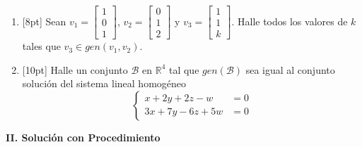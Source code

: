 \documentclass[11pt]{article}
\begin{document}
\begin{enumerate}
\item{}[8pt] Sean $v_1 = \begin{bmatrix}1\\0\\1\end{bmatrix}$, $v_2 = \begin{bmatrix}0\\1\\2\end{bmatrix}$ y $v_3 = \begin{bmatrix}1\\1\\k\end{bmatrix}$. Halle todos los valores de $k$ tales que $v_3\in gen(v_1,v_2)$.

\vspace{4pt}

\item{}[10pt] Halle un conjunto $\mathcal{B}$ en $\mathbb{R}^4$ tal que $gen(\mathcal{B})$ sea igual al conjunto solución del sistema lineal homogéneo
\[
\left\{
\begin{aligned}
x+2y+2z-w &= 0\\
3x+7y-6z+5w &= 0
\end{aligned}
\right.
\]

\vspace{4pt}
\end{enumerate}

\vspace{6pt}
\begin{center}\textbf{II. Solución con Procedimiento}\end{center}
\end{document}
